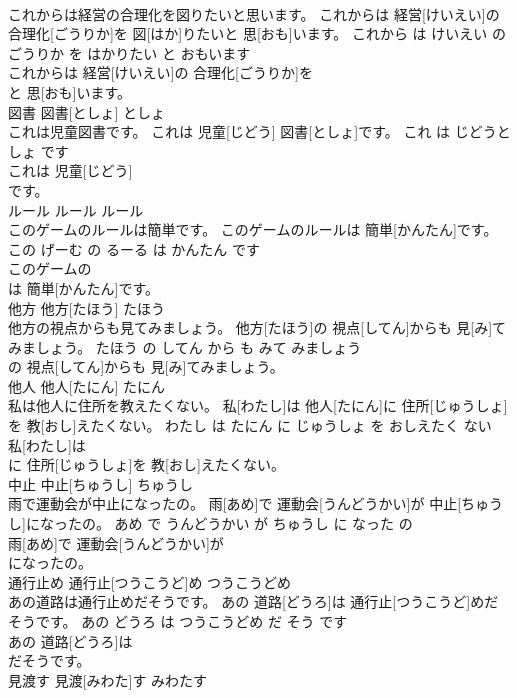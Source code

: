 \documentclass[8pt]{extreport}
\begin{document}
\begin{CJK}{UTF8}{min}
\\	これからは経営の合理化を図りたいと思います。	これからは 経営[けいえい]の 合理化[ごうりか]を 図[はか]りたいと 思[おも]います。	これから は けいえい の ごうりか を はかりたい と おもいます	
\\	これからは 経営[けいえい]の 合理化[ごうりか]を
\\	と 思[おも]います。			
\\	図書	図書[としょ]	としょ	
\\	これは児童図書です。	これは 児童[じどう] 図書[としょ]です。	これ は じどうとしょ です	
\\	これは 児童[じどう]
\\	です。			
\\	ルール	ルール	ルール	
\\	このゲームのルールは簡単です。	このゲームのルールは 簡単[かんたん]です。	この げーむ の るーる は かんたん です	
\\	このゲームの
\\	は 簡単[かんたん]です。			
\\	他方	他方[たほう]	たほう	
\\	他方の視点からも見てみましょう。	他方[たほう]の 視点[してん]からも 見[み]てみましょう。	たほう の してん から も みて みましょう	
\\	の 視点[してん]からも 見[み]てみましょう。			
\\	他人	他人[たにん]	たにん	
\\	私は他人に住所を教えたくない。	私[わたし]は 他人[たにん]に 住所[じゅうしょ]を 教[おし]えたくない。	わたし は たにん に じゅうしょ を おしえたく ない	
\\	私[わたし]は
\\	に 住所[じゅうしょ]を 教[おし]えたくない。			
\\	中止	中止[ちゅうし]	ちゅうし	
\\	雨で運動会が中止になったの。	雨[あめ]で 運動会[うんどうかい]が 中止[ちゅうし]になったの。	あめ で うんどうかい が ちゅうし に なった の	
\\	雨[あめ]で 運動会[うんどうかい]が
\\	になったの。			
\\	通行止め	通行止[つうこうど]め	つうこうどめ	
\\	あの道路は通行止めだそうです。	あの 道路[どうろ]は 通行止[つうこうど]めだそうです。	あの どうろ は つうこうどめ だ そう です	
\\	あの 道路[どうろ]は
\\	だそうです。			
\\	見渡す	見渡[みわた]す	みわたす	

\end{CJK}
\end{document}
